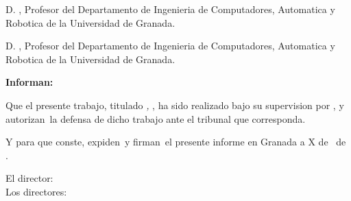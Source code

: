 
\thispagestyle{empty}

\vspace*{2cm}
\noindent D. \textbf{\tfgtutorA}, Profesor del Departamento de Ingenieria de Computadores, Automatica y Robotica de la Universidad de Granada.

\ifx\tfgtutorB\empty\else
  \vspace{0.4cm}
  \noindent D. \textbf{\tfgtutorB}, Profesor del Departamento de Ingenieria de Computadores, Automatica y Robotica de la Universidad de Granada.
\fi

\vspace{0.8cm}
\noindent\textbf{Informa\ifx\tfgtutorB\empty\else n\fi:}

\vspace{0.4cm}
\noindent Que el presente trabajo, titulado \emph{\tfgtitulo, \tfgsubtitulo}, ha sido realizado bajo su supervision por \textbf{\tfgautor}, y autoriza\ifx\tfgtutorB\empty\else n\fi\ la defensa de dicho trabajo ante el tribunal que corresponda.

\vspace{0.6cm}
\noindent Y para que conste, expide\ifx\tfgtutorB\empty\else n\fi\ y firma\ifx\tfgtutorB\empty\else n\fi\ el presente informe en Granada a X de \tfgmes\ de \tfganio.

\vspace{2.5cm}
\noindent
\ifx\tfgtutorB\empty
  El director:\\[1cm]
  \tfgtutorA
\else
  Los directores:\\[1cm]
  \begin{minipage}{0.45\textwidth}\centering \tfgtutorA \end{minipage}\hfill
  \begin{minipage}{0.45\textwidth}\centering \tfgtutorB \end{minipage}
\fi

\cleardoublepage

